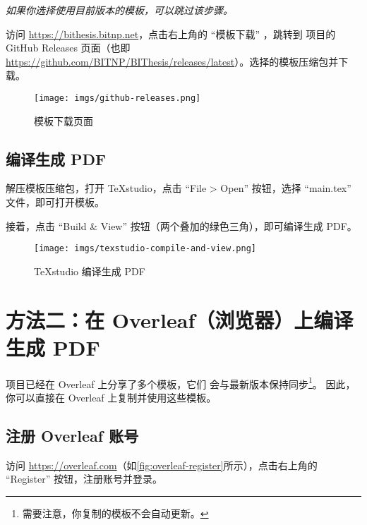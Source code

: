 \textit{如果你选择使用目前版本的模板，可以跳过该步骤。}

访问 \url{https://bithesis.bitnp.net}，点击右上角的 ``模板下载'' ，跳转到 \BIThesis 项目的 GitHub Releases 页面（也即 \url{https://github.com/BITNP/BIThesis/releases/latest}）。选择的模板压缩包并下载。


\begin{figure}[H]
  \begin{center}
    \texttt{[image: imgs/github-releases.png]}
  \end{center}
  \caption{模板下载页面}
  \label{fig:local-template-download}
\end{figure}

\subsection{编译生成 PDF}

解压模板压缩包，打开 TeXstudio，点击 ``File > Open'' 按钮，选择 ``main.tex'' 文件，即可打开模板。

接着，点击 ``Build \& View'' 按钮（两个叠加的绿色三角），即可编译生成 PDF。

\begin{figure}[H]
  \begin{center}
    \texttt{[image: imgs/texstudio-compile-and-view.png]}
  \end{center}
  \caption{TeXstudio 编译生成 PDF}
  \label{fig:texstudio-compile-and-view}
\end{figure}

\section{方法二：在 Overleaf（浏览器）上编译生成 PDF}
\label{sec:overleaf-compile}

\BIThesis 项目已经在 Overleaf 上分享了多个模板，它们
会与最新版本保持同步\footnote{需要注意，你复制的模板不会自动更新。}。
因此，你可以直接在 Overleaf 上复制并使用这些模板。

\subsection{注册 Overleaf 账号}

访问 \url{https://overleaf.com}（如\autoref{fig:overleaf-register}所示），点击右上角的 ``Register'' 按钮，注册账号并登录。

